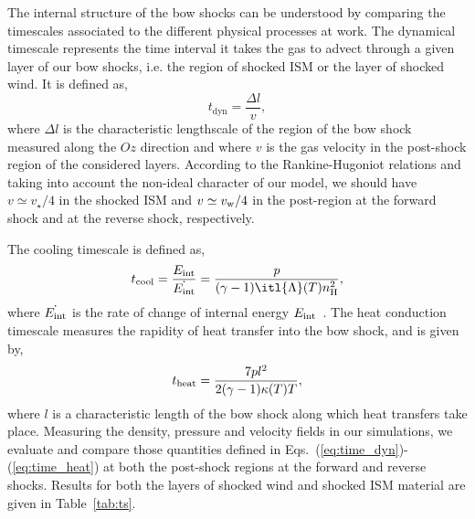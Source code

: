 \documentclass[useAMS,usenatbib]{mn2e}
\begin{document}
The internal structure of the bow shocks can be understood \textcolor{black}{by} comparing the timescales
associated to the different physical processes at work. The dynamical 
timescale represents the time interval it takes the gas to advect  
through a given layer of our bow shocks, i.e. the region of shocked 
ISM or the layer of shocked wind. It is defined as, 
%
\begin{equation}
t_{\mathrm{dyn}}=\frac{ \Delta l }{ v }, 
\label{eq:time_dyn}
\end{equation}
%
where $\Delta l$ is the characteristic lengthscale of the region of the bow shock 
measured along the $Oz$ direction and where $v$ is the gas velocity in the post-shock 
region of the considered layers. According to the Rankine-Hugoniot relations and taking 
into account the non-ideal character of our model, we should have 
$v \simeq v_{\star}/4$ in the shocked ISM and $v \simeq v_{\rm w}/4$ in the post-region at the 
forward shock and at the reverse shock, respectively. 



The cooling timescale is defined as,  
%
\begin{equation}
t_{\mathrm{cool}} =  \frac{E_{\rm int}}{\dot{E_{\rm int}}}  = \frac{p}{(\gamma-1)\itl{\Lambda}(T) n_{\rm H}^{2}},  
\label{eq:time_cool}
\end{equation}
%
where $\dot{E_{\rm int}}$ is the rate of change of internal energy $E_{\rm int}$~\citep{orlando_aa_444_2005}. 
The heat conduction timescale measures the rapidity of heat transfer into the 
bow shock, and is given by, 
%
\begin{equation}
  t_{\rm heat} = \frac{7pl^{2}}{2(\gamma-1)\kappa(T)T}, 
\label{eq:time_heat}
\end{equation}
%
where $l$ is a characteristic length of the bow shock along which heat transfers take 
place. Measuring the density, 
pressure and velocity fields in our simulations, we evaluate and compare those quantities 
defined in Eqs.~(\ref{eq:time_dyn})-(\ref{eq:time_heat}) at both 
the post-shock regions at the forward and reverse shocks. 
Results for both the layers of shocked wind and shocked 
ISM material are given in Table~\ref{tab:ts}. 
\end{document}
